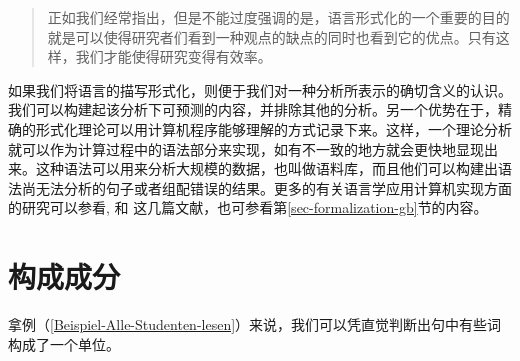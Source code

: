 \begin{quote}
正如我们经常指出，但是不能过度强调的是，语言形式化的一个重要的目的就是可以使得研究者们看到一种观点的缺点的同时也看到它的优点。只有这样，我们才能使得研究变得有效率。
\citep[]{Dowty79a}
\end{quote}
%
如果我们将语言的描写形式化，则便于我们对一种分析所表示的确切含义的认识。我们可以构建起该分析下可预测的内容，并排除其他的分析。另一个优势在于，精确的形式化理论可以用计算机程序能够理解的方式记录下来。这样，一个理论分析就可以作为计算过程中的语法部分来实现，如有不一致的地方就会更快地显现出来。这种语法可以用来分析大规模的数据，也叫做语料库，而且他们可以构建出语法尚无法分析的句子或者组配错误的结果。更多的有关语言学应用计算机实现方面的研究可以参看,  和 这几篇文献，也可参看第\ref{sec-formalization-gb}节的内容。

\section{构成成分}
\label{konstituententests}\label{sec-constituents}

拿例（\ref{Beispiel-Alle-Studenten-lesen}）来说，我们可以凭直觉判断出句中有些词构成了一个单位。

